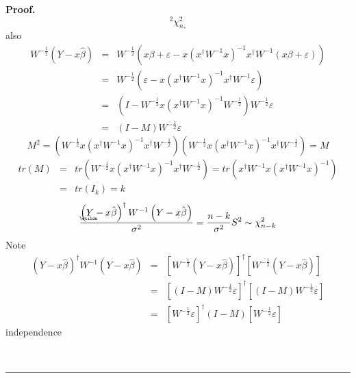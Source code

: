 \documentclass{article}
\newenvironment{proof}[1][Proof]{\noindent\textbf{#1.} }{\ \rule{0.5em}{0.5em}}
\begin{document}
\begin{proof}
\begin{equation*}
^{2}\chi _{n_{\ast }}^{2}
\end{equation*}%
also%
\begin{eqnarray*}
W^{-\frac{1}{2}}\left( Y-x\hat{\beta}\right)  &=&W^{-\frac{1}{2}}\left(
x\beta +\varepsilon -x\left( x^{\dagger }W^{-1}x\right) ^{-1}x^{\dagger
}W^{-1}\left( x\beta +\varepsilon \right) \right)  \\
&=&W^{-\frac{1}{2}}\left( \varepsilon -x\left( x^{\dagger }W^{-1}x\right)
^{-1}x^{\dagger }W^{-1}\varepsilon \right)  \\
&=&\left( I-W^{-\frac{1}{2}}x\left( x^{\dagger }W^{-1}x\right) ^{-1}W^{-%
\frac{1}{2}}\right) W^{-\frac{1}{2}}\varepsilon  \\
&=&\left( I-M\right) W^{-\frac{1}{2}}\varepsilon 
\end{eqnarray*}%
\begin{equation*}
M^{2}=\left( W^{-\frac{1}{2}}x\left( x^{\dagger }W^{-1}x\right)
^{-1}x^{\dagger }W^{-\frac{1}{2}}\right) \left( W^{-\frac{1}{2}}x\left(
x^{\dagger }W^{-1}x\right) ^{-1}x^{\dagger }W^{-\frac{1}{2}}\right) =M
\end{equation*}%
\begin{eqnarray*}
tr\left( M\right)  &=&tr\left( W^{-\frac{1}{2}}x\left( x^{\dagger
}W^{-1}x\right) ^{-1}x^{\dagger }W^{-\frac{1}{2}}\right) =tr\left(
x^{\dagger }W^{-1}x\left( x^{\dagger }W^{-1}x\right) ^{-1}\right)  \\
&=&tr\left( I_{k}\right) =k
\end{eqnarray*}%
\begin{equation*}
\frac{\left( 
\underaccent{\wtilde}{Y}%
-x\hat{\beta}\right) ^{\dagger }W^{-1}\left( Y-x\hat{\beta}\right) }{\sigma
^{2}}=\frac{n-k}{\sigma ^{2}}S^{2}\sim \chi _{n-k}^{2}
\end{equation*}%
Note%
\begin{eqnarray*}
\left( Y-x\hat{\beta}\right) ^{\dagger }W^{-1}\left( Y-x\hat{\beta}\right) 
&=&\left[ W^{-\frac{1}{2}}\left( Y-x\hat{\beta}\right) \right] ^{\dagger }%
\left[ W^{-\frac{1}{2}}\left( Y-x\hat{\beta}\right) \right]  \\
&=&\left[ \left( I-M\right) W^{-\frac{1}{2}}\varepsilon \right] ^{\dagger }%
\left[ \left( I-M\right) W^{-\frac{1}{2}}\varepsilon \right]  \\
&=&\left[ W^{-\frac{1}{2}}\varepsilon \right] ^{\dagger }\left( I-M\right) %
\left[ W^{-\frac{1}{2}}\varepsilon \right] 
\end{eqnarray*}%
independence\newline

\end{proof}
\end{document}
